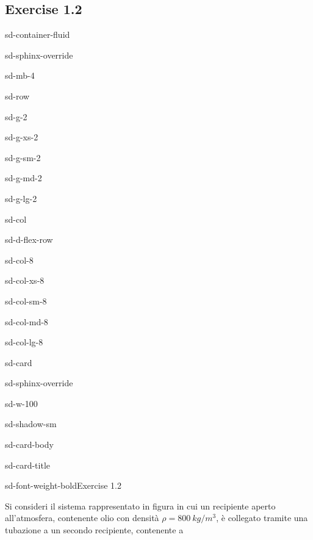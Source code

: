 \documentclass[letterpaper,10pt,italian]{jupyterBook}
\begin{document}
\subsection{Exercise 1.2 }
\label{\detokenize{polimi/fluidmechanics-ita/template/capitoli/01_statica/0202in:exercise-1-2-stevino-law-pressure-in-a-vessel}}\label{\detokenize{polimi/fluidmechanics-ita/template/capitoli/01_statica/0202in:fluid-mechanics-statics-ex-01}}\label{\detokenize{polimi/fluidmechanics-ita/template/capitoli/01_statica/0202in::doc}}
\begin{sphinxuseclass}{sd-container-fluid}
\begin{sphinxuseclass}{sd-sphinx-override}
\begin{sphinxuseclass}{sd-mb-4}
\begin{sphinxuseclass}{sd-row}
\begin{sphinxuseclass}{sd-g-2}
\begin{sphinxuseclass}{sd-g-xs-2}
\begin{sphinxuseclass}{sd-g-sm-2}
\begin{sphinxuseclass}{sd-g-md-2}
\begin{sphinxuseclass}{sd-g-lg-2}
\begin{sphinxuseclass}{sd-col}
\begin{sphinxuseclass}{sd-d-flex-row}
\begin{sphinxuseclass}{sd-col-8}
\begin{sphinxuseclass}{sd-col-xs-8}
\begin{sphinxuseclass}{sd-col-sm-8}
\begin{sphinxuseclass}{sd-col-md-8}
\begin{sphinxuseclass}{sd-col-lg-8}
\begin{sphinxuseclass}{sd-card}
\begin{sphinxuseclass}{sd-sphinx-override}
\begin{sphinxuseclass}{sd-w-100}
\begin{sphinxuseclass}{sd-shadow-sm}
\begin{sphinxuseclass}{sd-card-body}
\begin{sphinxuseclass}{sd-card-title}
\begin{sphinxuseclass}{sd-font-weight-bold}Exercise 1.2
\end{sphinxuseclass}
\end{sphinxuseclass}
\sphinxAtStartPar
Si consideri il sistema rappresentato in figura in cui un recipiente
aperto all’atmosfera, contenente olio con densità \(\rho= 800\ kg/m^3\), è
collegato tramite una tubazione a un secondo recipiente, contenente a

\end{sphinxuseclass}
\end{sphinxuseclass}
\end{sphinxuseclass}
\end{sphinxuseclass}
\end{sphinxuseclass}
\end{sphinxuseclass}
\end{sphinxuseclass}
\end{sphinxuseclass}
\end{sphinxuseclass}
\end{sphinxuseclass}
\end{sphinxuseclass}
\end{sphinxuseclass}
\end{sphinxuseclass}
\end{sphinxuseclass}
\end{sphinxuseclass}
\end{sphinxuseclass}
\end{sphinxuseclass}
\end{sphinxuseclass}
\end{sphinxuseclass}
\end{sphinxuseclass}
\end{sphinxuseclass}
\end{document}
